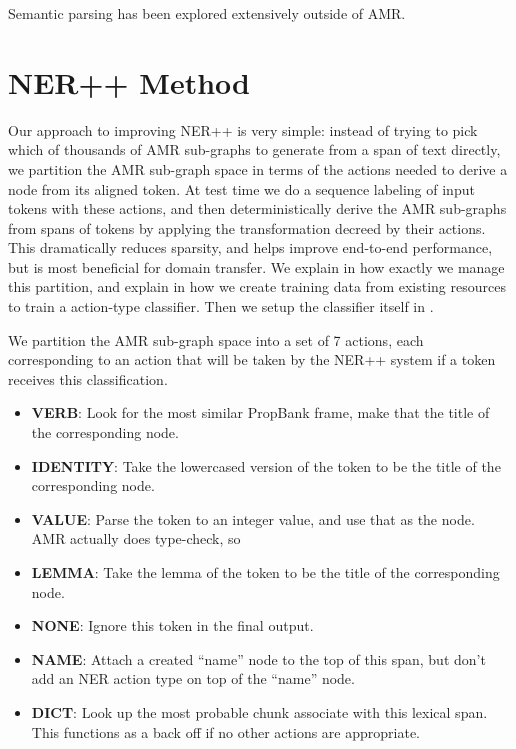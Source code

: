 \documentclass[11pt]{article}
\begin{document}
Semantic parsing has been explored extensively outside of AMR. 

\section{NER++ Method}

Our approach to improving NER++ is very simple: instead of trying to pick which of thousands of AMR sub-graphs to generate from a span of text directly, we partition the AMR sub-graph space in terms of the actions needed to derive a node from its aligned token. At test time we do a sequence labeling of input tokens with these actions, and then deterministically derive the AMR sub-graphs from spans of tokens by applying the transformation decreed by their actions. This dramatically reduces sparsity, and helps improve end-to-end performance, but is most beneficial for domain transfer. We explain in  how exactly we manage this partition, and explain in  how we create training data from existing resources to train a action-type classifier. Then we setup the classifier itself in .


We partition the AMR sub-graph space into a set of 7 actions, each corresponding to an action that will be taken by the NER++ system if a token receives this classification.

\begin{itemize}
\item \textbf{VERB}: Look for the most similar PropBank frame, make that the title of the corresponding node.
\item \textbf{IDENTITY}: Take the lowercased version of the token to be the title of the corresponding node.
\item \textbf{VALUE}: Parse the token to an integer value, and use that as the node. AMR actually does type-check, so 
\item \textbf{LEMMA}: Take the lemma of the token to be the title of the corresponding node.
\item \textbf{NONE}: Ignore this token in the final output.
\item \textbf{NAME}: Attach a created ``name'' node to the top of this span, but don't add an NER action type on top of the ``name'' node.
\item \textbf{DICT}: Look up the most probable chunk associate with this lexical span. This functions as a back off if no other actions are appropriate.
\end{itemize}
\end{document}
